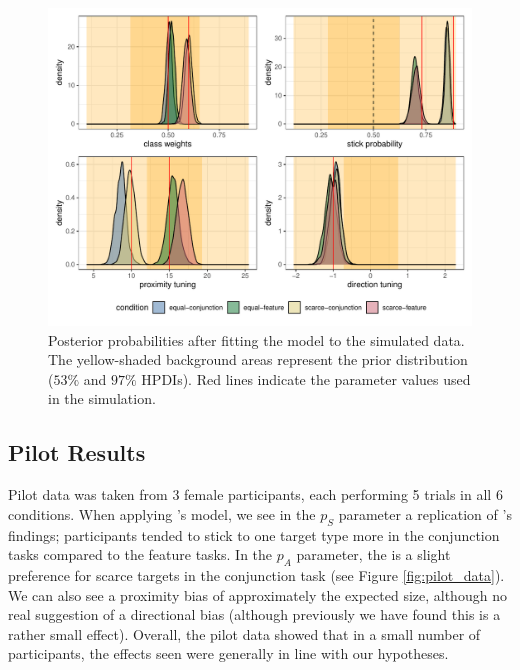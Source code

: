\documentclass[12pt]{article}
\begin{document}
\begin{figure}[H]
    \centering
    \includegraphics[width=\textwidth]{figs/sensiv_sim.pdf}
    \caption{Posterior probabilities after fitting the model to the simulated data. The yellow-shaded background areas represent the prior distribution ($53\%$ and $97\%$ HPDIs). Red lines indicate the parameter values used in the simulation.}
    \label{fig:sensi_sim}
\end{figure}

\subsection{Pilot Results}

Pilot data was taken from 3 female participants, each performing 5 trials in all 6 conditions. When applying \citep{clarke2022foraging}'s model, we see in the $p_S$ parameter a replication of \citep{kristjansson2014common}'s findings; participants tended to stick to one target type more in the conjunction tasks compared to the feature tasks. In the $p_A$ parameter, the is a slight preference for scarce targets in the conjunction task (see Figure \ref{fig:pilot_data}). We can also see a proximity bias of approximately the expected size, although no real suggestion of a directional bias (although previously we have found this is a rather small effect). Overall, the pilot data showed that in a small number of participants, the effects seen were generally in line with our hypotheses.
\end{document}
